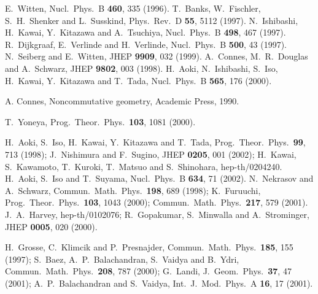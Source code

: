 \documentclass[a4paper,prl,showpacs,twocolumn]{revtex4}
\begin{document}
\begin{thebibliography}{all}

E.~Witten,
Nucl.\ Phys.\ B {\bf 460}, 335 (1996).
T.~Banks, W.~Fischler, S.~H.~Shenker and L.~Susskind,
Phys.\ Rev.\ D {\bf 55}, 5112 (1997).
N.~Ishibashi, H.~Kawai, Y.~Kitazawa and A.~Tsuchiya,
Nucl.\ Phys.\ B {\bf 498}, 467 (1997).
R.~Dijkgraaf, E.~Verlinde and H.~Verlinde,
Nucl.\ Phys.\ B {\bf 500}, 43 (1997).
N.~Seiberg and E.~Witten,
JHEP {\bf 9909}, 032 (1999).
A.~Connes, M.~R.~Douglas and A.~Schwarz,
JHEP {\bf 9802}, 003 (1998).
H.~Aoki, N.~Ishibashi, S.~Iso, H.~Kawai, Y.~Kitazawa and T.~Tada,
Nucl.\ Phys.\ B {\bf 565}, 176 (2000).

A. Connes, Noncommutative geometry, Academic Press, 1990.

T.~Yoneya,
Prog.\ Theor.\ Phys.\  {\bf 103}, 1081 (2000).

H.~Aoki, S.~Iso, H.~Kawai, Y.~Kitazawa and T.~Tada,
Prog.\ Theor.\ Phys.\  {\bf 99}, 713 (1998);
J.~Nishimura and F.~Sugino,
JHEP {\bf 0205}, 001 (2002);
H.~Kawai, S.~Kawamoto, T.~Kuroki, T.~Matsuo and S.~Shinohara,
hep-th/0204240.
%
H.~Aoki, S.~Iso and T.~Suyama,
Nucl.\ Phys.\ B {\bf 634}, 71 (2002).
N.~Nekrasov and A.~Schwarz,
Commun.\ Math.\ Phys.\  {\bf 198}, 689 (1998);
K.~Furuuchi,
Prog.\ Theor.\ Phys.\  {\bf 103}, 1043 (2000);
Commun.\ Math.\ Phys.\  {\bf 217}, 579 (2001).
J.~A.~Harvey,
hep-th/0102076;
%
R.~Gopakumar, S.~Minwalla and A.~Strominger,
JHEP {\bf 0005}, 020 (2000).

H.~Grosse, C.~Klimcik and P.~Presnajder,
Commun.\ Math.\ Phys.\  {\bf 185}, 155 (1997);
%
%
S.~Baez, A.~P.~Balachandran, S.~Vaidya and B.~Ydri,
Commun.\ Math.\ Phys.\  {\bf 208}, 787 (2000);
%
G.~Landi,
J.\ Geom.\ Phys.\  {\bf 37}, 47 (2001);
%
A.~P.~Balachandran and S.~Vaidya,
Int.\ J.\ Mod.\ Phys.\ A {\bf 16}, 17 (2001).


\end{thebibliography}
\end{document}
